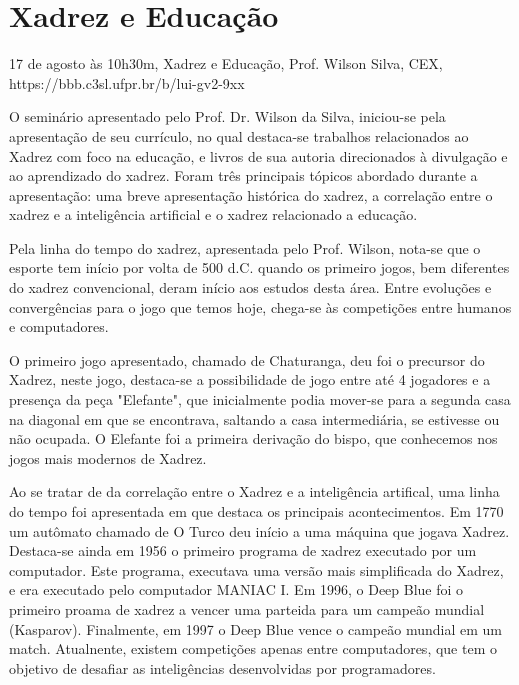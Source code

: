 \section{Xadrez e Educação}

\begin{center}
  \vspace{1cm}
  17 de agosto às 10h30m, Xadrez e Educação, Prof. Wilson Silva, CEX, https://bbb.c3sl.ufpr.br/b/lui-gv2-9xx
  \vspace{1cm}
\end{center}

O seminário apresentado pelo Prof. Dr. Wilson da Silva, iniciou-se pela apresentação de seu currículo, no qual destaca-se trabalhos relacionados ao Xadrez com foco na educação, e livros de sua autoria direcionados à divulgação e ao aprendizado do xadrez. Foram três principais tópicos abordado durante a apresentação: uma breve apresentação histórica do xadrez, a correlação entre o xadrez e a inteligência artificial e o xadrez relacionado a educação.

Pela linha do tempo do xadrez, apresentada pelo Prof. Wilson, nota-se que o esporte tem início por volta de 500 d.C. quando os primeiro jogos, bem diferentes do xadrez convencional, deram início aos estudos desta área. Entre evoluções e convergências para o jogo que temos hoje, chega-se às competições entre humanos e computadores.

O primeiro jogo apresentado, chamado de Chaturanga, deu foi o precursor do Xadrez, neste jogo, destaca-se a possibilidade de jogo entre até 4 jogadores e a presença da peça "Elefante", que inicialmente podia mover-se para a segunda casa na diagonal em que se encontrava, saltando a casa intermediária, se estivesse ou não ocupada. O Elefante foi a primeira derivação do bispo, que conhecemos nos jogos mais modernos de Xadrez.

Ao se tratar de da correlação entre o Xadrez e a inteligência artifical, uma linha do tempo foi apresentada em que destaca os principais acontecimentos. Em 1770 um autômato chamado de O Turco deu início a uma máquina que jogava Xadrez. Destaca-se ainda em 1956 o primeiro programa de xadrez executado por um computador. Este programa, executava uma versão mais simplificada do Xadrez, e era executado pelo computador MANIAC I. Em 1996, o Deep Blue foi o primeiro proama de xadrez a vencer uma parteida para um campeão mundial (Kasparov). Finalmente, em 1997 o Deep Blue vence o campeão mundial em um match. Atualnente, existem competições apenas entre computadores, que tem o objetivo de desafiar as inteligências desenvolvidas por programadores.

